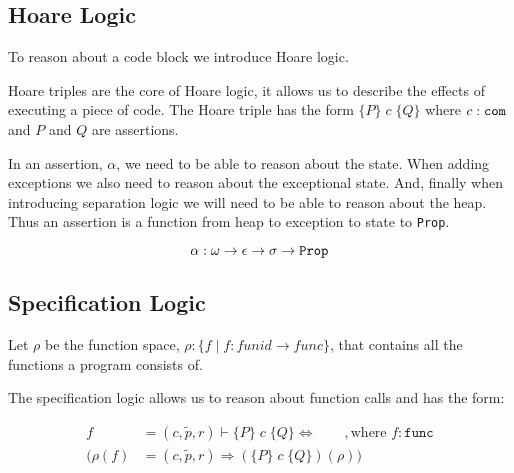 
\subsection{Hoare Logic}
To reason about a code block we introduce Hoare logic.

Hoare triples are the core of Hoare logic, it allows us to describe the effects of executing a piece of code. The Hoare triple has the form $\{P\}\;c\;\{Q\}$ where $c : \verb|com|$ and $P$ and $Q$ are assertions.

In an assertion, $\alpha$, we need to be able to reason about the state. When adding exceptions we also need to reason about the exceptional state. And, finally when introducing separation logic we will need to be able to reason about the heap. Thus an assertion is a function from heap to exception to state to \verb|Prop|.

\begin{equation}\label{eqn:alpha-type}
\alpha: \omega \rightarrow \epsilon \rightarrow \sigma \rightarrow \verb|Prop|
\end{equation}


\subsection{Specification Logic}
Let $\rho$ be the function space, $\rho : \{f \; | \; f: funid \rightarrow func\}$, that contains all the functions a program consists of.

The specification logic allows us to reason about function calls and has the form:

\begin{equation}
\begin{split}
f &= (c,\tilde{p},r) \vdash \{P\} \; c \; \{Q\} \Leftrightarrow \qquad, \text{where } f : \texttt{func}\\
(\rho(f) &= (c,\tilde{p},r) \Rightarrow (\{P\} \; c \; \{Q\})(\rho))
\end{split} 
\end{equation}

